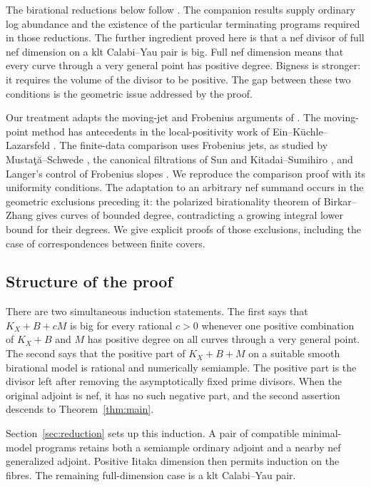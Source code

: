The birational reductions below follow \cite[Sections~4--7]{LP}.
The companion results \cite{LA,MM} supply ordinary log abundance and
the existence of the particular terminating programs required in those
reductions. The further ingredient proved here is that a nef divisor
of full nef dimension on a klt Calabi--Yau pair is big. Full nef
dimension means that every curve through a very general point has
positive degree. Bigness is stronger: it requires the volume of the
divisor to be positive. The gap between these two conditions is the
geometric issue addressed by the proof.

Our treatment adapts the moving-jet and Frobenius arguments of
\cite[Sections~7--9]{LA}. The moving-point method has antecedents in
the local-positivity work of Ein--K\"uchle--Lazarsfeld \cite{EKL}.
The finite-data comparison uses Frobenius jets, as studied by
Musta\c t\u a--Schwede \cite{MustataSchwede}, the canonical filtrations
of Sun and Kitadai--Sumihiro \cite{Sun,KS}, and Langer's control of
Frobenius slopes \cite{Langer}. We reproduce the comparison proof
with its uniformity conditions. The adaptation to an arbitrary nef
summand occurs in the geometric exclusions preceding it: the polarized
birationality theorem of Birkar--Zhang gives curves of bounded degree,
contradicting a growing integral lower bound for their degrees. We
give explicit proofs of those exclusions, including the case of
correspondences between finite covers.

\subsection{Structure of the proof}

There are two simultaneous induction statements. The first says that
$K_X+B+cM$ is big for every rational $c>0$ whenever one positive
combination of $K_X+B$ and $M$ has positive degree on all curves through
a very general point. The second says that the positive part of
$K_X+B+M$ on a suitable smooth birational model is rational and
numerically semiample. The positive part is the divisor left after
removing the asymptotically fixed prime divisors. When the original
adjoint is nef, it has no such negative part, and the second assertion
descends to Theorem~\ref{thm:main}.

Section~\ref{sec:reduction} sets up this induction. A pair of compatible
minimal-model programs retains both a semiample ordinary adjoint and a
nearby nef generalized adjoint. Positive Iitaka dimension then permits
induction on the fibres. The remaining full-dimension case is a klt
Calabi--Yau pair.

